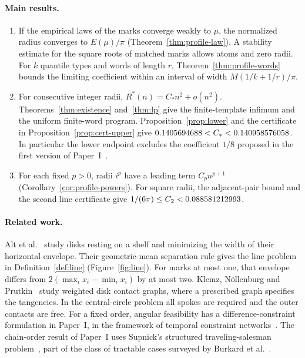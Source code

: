 \documentclass[11pt,letterpaper]{article}
\theoremstyle{definition}\newtheorem{definition}[theorem]{Definition}
\theoremstyle{remark}\newtheorem{remark}[theorem]{Remark}
\newcommand{\Rstar}{R^\ast}
\newcommand{\CC}{C_\ast}
\begin{document}
\paragraph{Main results.}
\begin{enumerate}
\item If the empirical laws of the marks converge weakly to $\mu$, the
normalized radius converges to $E(\mu)/\pi$
(Theorem~\ref{thm:profile-law}). A stability estimate for the square
roots of matched marks allows atoms and zero radii. For $k$ quantile
types and words of length $r$, Theorem~\ref{thm:profile-words} bounds
the limiting coefficient within an interval of width $M(1/k+1/r)/\pi$.
\item For consecutive integer radii,
$\Rstar(n)=\CC n^2+o(n^2)$. Theorems~\ref{thm:existence}
and~\ref{thm:lp} give the finite-template infimum and the uniform
finite-word program. Proposition~\ref{prop:lower} and the certificate
in Proposition~\ref{prop:cert-upper} give $\CstarLower<\CC<\CstarUpper$.
In particular the lower endpoint excludes the coefficient $1/8$ proposed
in the first version of Paper~I~\cite{paperI}.
\item For each fixed $p>0$, radii $i^p$ have a leading term
$C_p n^{p+1}$ (Corollary~\ref{cor:profile-powers}). For square radii,
the adjacent-pair bound and the second line certificate give
$1/(6\pi)\le C_2<0.088581212993$.
\end{enumerate}

\paragraph{Related work.}
Alt et al.~\cite{shelf} study disks resting on a shelf and minimizing
the width of their horizontal envelope. Their geometric-mean separation
rule gives the line problem in Definition~\ref{def:line} (Figure~\ref{fig:line}).
For marks at most one, that envelope differs from
$2(\max_i x_i-\min_i x_i)$ by at most two.
Klemz, N\"ollenburg and Prutkin~\cite{contact} study weighted disk
contact graphs, where a prescribed graph specifies the tangencies. In
the central-circle problem all spokes are required and the outer
contacts are free. For a fixed order, angular feasibility has a
difference-constraint formulation in Paper~I, in the framework of
temporal constraint networks~\cite{temporal}. The chain-order result
of Paper~I uses Supnick's structured traveling-salesman
problem~\cite{supnick}, part of the class of tractable cases surveyed
by Burkard et al.~\cite{burkard}.
\end{document}
